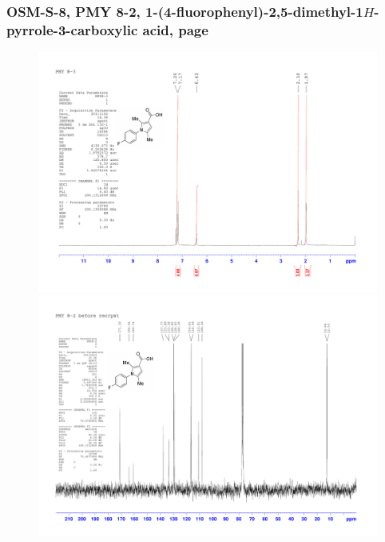 \documentclass[12pt, a4paper,titlepage]{article}
\begin{document}
{\subsubsection*{OSM-S-8, PMY 8-2, 1-(4-fluorophenyl)-2,5-dimethyl-1$H$-pyrrole-3-carboxylic acid, page \pageref{exp:PMY8}}
\label{spec:PMY8}
	\begin{figure}[H] 
	\begin{center}
	\includegraphics[width=14.5cm]{expdata/PMY8/1H}
	\includegraphics[width=14.5cm]{expdata/PMY8/13C}
	\end{center}
	\end{figure}

}
\end{document}
